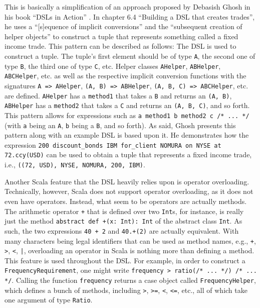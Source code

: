 \documentclass[article, 10pt, type=bsc, colorback, accentcolor=tud8b, parskip=half, bibliography=totocnumbered]{tudthesis}
\begin{document}
This is basically a simplification of an approach proposed by Debasish Ghosh in his book ``DSLs in Action'' \cite{Ghosh:2010:DA:1965333}.
In chapter 6.4 ``Building a DSL that creates trades'', he uses a ``[s]equence of implicit conversions'' and the ``subsequent creation of helper objects'' to construct a tuple that represents something called a fixed income trade.
This pattern can be described as follows:
The DSL is used to construct a tuple.
The tuple's first element should be of type \lstinline{A}, the second one of type \lstinline{B}, the third one of type \lstinline{C}, etc.
Helper classes \lstinline{AHelper}, \lstinline{ABHelper}, \lstinline{ABCHelper}, etc. as well as the respective implicit conversion functions with the signatures \lstinline{A => AHelper}, \lstinline{(A, B) => ABHelper}, \lstinline{(A, B, C) => ABCHelper}, etc. are defined.
\lstinline{AHelper} has a \lstinline{method1} that takes a \lstinline{B} and returns an \lstinline{(A, B)}, \lstinline{ABHelper} has a \lstinline{method2} that takes a \lstinline{C} and returns an \lstinline{(A, B, C)}, and so forth.
This pattern allows for expressions such as \lstinline{a method1 b method2 c /* ... */} (with \lstinline{a} being an \lstinline{A}, \lstinline{b} being a \lstinline{B}, and so forth).
As said, Ghosh \cite{Ghosh:2010:DA:1965333} presents this pattern along with an example DSL is based upon it.
He demonstrates how the expression \lstinline{200 discount_bonds IBM for_client NOMURA on NYSE at 72.ccy(USD)} can be used to obtain a tuple that represents a fixed income trade, i.e., \lstinline{((72, USD), NYSE, NOMURA, 200, IBM)}.

Another Scala feature that the DSL heavily relies upon is operator overloading.
Technically, however, Scala does not support operator overloading, as it does not even have operators.
Instead, what seem to be operators are actually methods.
The arithmetic operator \lstinline{+} that is defined over two \lstinline{Int}s, for instance, is really just the method \lstinline{abstract def +(x: Int): Int} of the abstract class \lstinline{Int}.
As such, the two expressions \lstinline{40 + 2} and \lstinline{40.+(2)} are actually equivalent.
With many characters being legal identifiers that can be used as method names, e.g., \lstinline{+}, \lstinline{>}, \lstinline{<}, \lstinline{|}, overloading an operator in Scala is nothing more than defining a method.
This feature is used throughout the DSL.
For example, in order to construct a \lstinline{FrequencyRequirement}, one might write \lstinline{frequency > ratio(/* ... */) /* ... */}.
Calling the function \lstinline{frequency} returns a case object called \lstinline{FrequencyHelper}, which defines a bunch of methods, including \lstinline{>}, \lstinline{>=}, \lstinline{<}, \lstinline{<=}, etc., all of which take one argument of type \lstinline{Ratio}.
\end{document}
